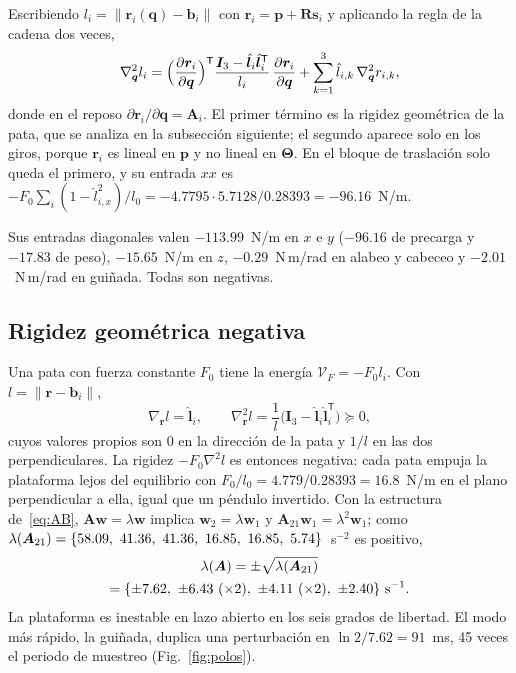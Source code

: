 \documentclass[conference]{IEEEtran}
\newcommand{\vect}[1]{\bm{#1}}
\newcommand{\T}{^{\mathsf{T}}}
\begin{document}
Escribiendo $l_i = \lVert\vect r_i(\vect q) - \vect b_i\rVert$ con $\vect r_i = \vect p + \vect R\vect s_i$ y aplicando la regla de la cadena dos veces,
\begin{equation}
\nabla^2_{\vect q}l_i = \Bigl(\frac{\partial\vect r_i}{\partial\vect q}\Bigr)\T\frac{\vect I_3 - \hat{\vect l}_i\hat{\vect l}_i\T}{l_i}\,\frac{\partial\vect r_i}{\partial\vect q} + \sum_{k=1}^3\hat l_{i,k}\,\nabla^2_{\vect q}r_{i,k},
\label{eq:hesl}
\end{equation}
donde en el reposo $\partial\vect r_i/\partial\vect q = \vect A_i$. El primer término es la rigidez geométrica de la pata, que se analiza en la subsección siguiente; el segundo aparece solo en los giros, porque $\vect r_i$ es lineal en $\vect p$ y no lineal en $\boldsymbol\Theta$. En el bloque de traslación solo queda el primero, y su entrada $xx$ es $-F_0\sum_i(1 - \hat l_{i,x}^2)/l_0 = -4.7795\cdot5.7128/0.28393 = -96.16$~N/m.

Sus entradas diagonales valen $-113.99$~N/m en $x$ e $y$ ($-96.16$ de precarga y $-17.83$ de peso), $-15.65$~N/m en $z$, $-0.29$~N\,m/rad en alabeo y cabeceo y $-2.01$~N\,m/rad en guiñada. Todas son negativas.

\subsection{Rigidez geométrica negativa}

Una pata con fuerza constante $F_0$ tiene la energía $\mathcal V_F = -F_0l_i$. Con $l = \lVert\vect r - \vect b_i\rVert$,
\begin{equation}
\nabla_{\vect r}l = \hat{\vect l}_i,\qquad \nabla^2_{\vect r}l = \frac{1}{l}\bigl(\vect I_3 - \hat{\vect l}_i\hat{\vect l}_i\T\bigr) \succeq 0,
\end{equation}
cuyos valores propios son $0$ en la dirección de la pata y $1/l$ en las dos perpendiculares. La rigidez $-F_0\nabla^2l$ es entonces negativa: cada pata empuja la plataforma lejos del equilibrio con $F_0/l_0 = 4.779/0.28393 = 16.8$~N/m en el plano perpendicular a ella, igual que un péndulo invertido. Con la estructura de~\eqref{eq:AB}, $\vect A\vect w = \lambda\vect w$ implica $\vect w_2 = \lambda\vect w_1$ y $\vect A_{21}\vect w_1 = \lambda^2\vect w_1$; como $\lambda(\vect A_{21}) = \{\EigAtwoOne\}$~s$^{-2}$ es positivo,
\begin{gather}
\lambda(\vect A) = \pm\sqrt{\lambda(\vect A_{21})}\nonumber\\ = \{\PolosLA\}\ \text{s}^{-1}.
\end{gather}
La plataforma es inestable en lazo abierto en los seis grados de libertad. El modo más rápido, la guiñada, duplica una perturbación en $\ln2/7.62 = 91$~ms, 45 veces el periodo de muestreo (Fig.~\ref{fig:polos}).
\end{document}
